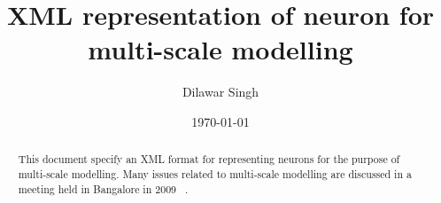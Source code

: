 \documentclass[a4paper,10pt]{article}
\title{XML representation of neuron for multi-scale modelling}
\author{Dilawar Singh}
\date{\today}
\begin{document}
\maketitle

\begin{abstract}

    This document specify an XML format for representing neurons for the purpose
    of multi-scale modelling. Many issues related to multi-scale modelling are
    discussed in a meeting held in Bangalore in 2009 ~\cite{icnf}.

\end{abstract}


{}

\end{document}
